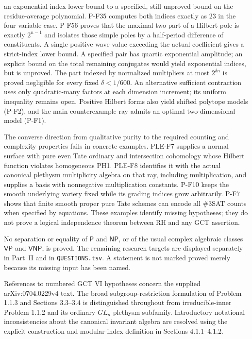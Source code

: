 \documentclass[11pt,a4paper]{article}
\begin{document}
an exponential index lower bound to a specified, still unproved
bound on the residue-average polynomial. P-F35 computes both
indices exactly as $23$ in the four-variable case.
P-F56 proves that the maximal two-part of a Hilbert pole is exactly
$2^{n-1}$ and isolates those simple poles by a half-period difference
of constituents. A single positive wave value exceeding the actual
coefficient gives a strict-index lower bound. A specified pair has
quartic exponential amplitude; an explicit bound on the total remaining
conjugates would yield exponential indices, but is unproved.
The part indexed by normalized multipliers at most $2^{\delta n}$
is proved negligible for every fixed $\delta<1/600$.
An alternative sufficient contraction uses only quadratic-many
factors at each dimension increment; its uniform inequality
remains open.
Positive Hilbert forms also yield
shifted polytope models (P-F2), and the main counterexample ray admits
an optimal two-dimensional model (P-F1).

The converse direction from qualitative purity to the required counting
and complexity properties fails in concrete examples. PLE-F7 supplies a
normal surface with pure even Tate ordinary and intersection cohomology
whose Hilbert function violates homogeneous PH1. PLE-F8 identifies it
with the actual canonical plethysm multiplicity algebra on that ray,
including multiplication, and supplies a basis with nonnegative
multiplication constants. P-F10 keeps the smooth
underlying variety fixed while its grading indices grow arbitrarily.
P-F7 shows that finite smooth proper pure Tate schemes can encode all
\#3SAT counts when specified by equations. These examples identify
missing hypotheses; they do not prove a logical independence theorem
between RH and any GCT assertion.

No separation or equality of $\mathsf P$ and $\mathsf{NP}$, or of the
usual complex algebraic classes $\mathsf{VP}$ and $\mathsf{VNP}$, is
proved. The remaining research targets are displayed separately in
Part~II and in \texttt{QUESTIONS.tsv}. A statement is not marked proved
merely because its missing input has been named.

References to numbered GCT VI hypotheses concern the supplied
arXiv:0704.0229v4 text. The broad subgroup-restriction formulation
of Problem 1.1.3 and Sections 3.3--3.4 is distinguished throughout
from irreducible-inner Problem 1.1.2 and its ordinary $GL_n$
plethysm subfamily. Introductory notational inconsistencies about
the canonical invariant algebra are resolved using the explicit
construction and modular-index definition in Sections 4.1.1--4.1.2.
\end{document}

